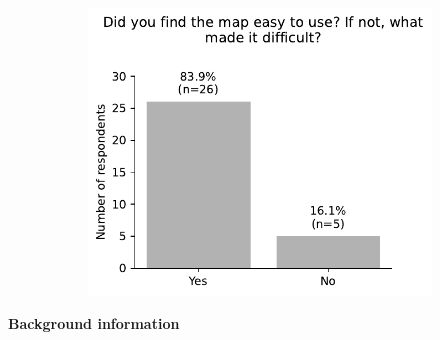 \begin{appendices}
\begin{minipage}{\textwidth}
\begin{figure}[H]
\begin{subfigure}[b]{0.5\textwidth}
	\end{subfigure}%
	\newline
	\begin{subfigure}[b]{0.5\textwidth}
		\includegraphics[width=\textwidth]{visual/figures/survey/9.pdf}
	\end{subfigure}%
\end{figure}
\end{minipage}

\begin{minipage}{\textwidth}
\textbf{Background information}


\end{minipage}
\end{appendices}
